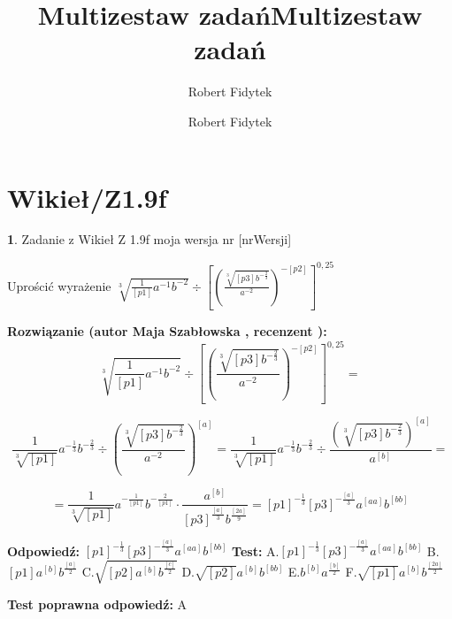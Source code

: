 \documentclass[12pt, a4paper]{article}
\title{Multizestaw zadań}
\author{Robert Fidytek}
\date{}\documentclass[12pt, a4paper]{article}
\title{Multizestaw zadań}
\author{Robert Fidytek}
\date{}
\theoremstyle{definition} %
\newtheorem{zad}{}
\theoremstyle{definition} %
\newtheorem{zad}{}
\newcommand{\kategoria}[1]{\section{#1}} %
\newcommand{\zadStart}[1]{\begin{zad}#1\newline} %
\newcommand{\zadStop}{\end{zad}}   %
\newcommand{\rozwStart}[2]{\noindent \textbf{Rozwiązanie (autor #1 , recenzent #2): }\newline} %
\newcommand{\rozwStop}{\newline}                                            %
\newcommand{\odpStart}{\noindent \textbf{Odpowiedź:}\newline}    %
\newcommand{\odpStop}{\newline}                                             %
\newcommand{\testStart}{\noindent \textbf{Test:}\newline} %
\newcommand{\testStop}{\newline} %
\newcommand{\kluczStart}{\noindent \textbf{Test poprawna odpowiedź:}\newline} %
\newcommand{\kluczStop}{\newline} %
\begin{document}
\maketitle


\kategoria{Wikieł/Z1.9f}
\zadStart{Zadanie z Wikieł Z 1.9f moja wersja nr [nrWersji]}


Uprościć wyrażenie $\sqrt[3]{\frac{1}{[p1]}a^{-1}b^{-2}}\div\left[\left(\frac{\sqrt[3]{[p3]b^{-\frac{2}{3}}}}{a^{-2}}\right)^{-[p2]}\right]^{0,25}$

\zadStop

\rozwStart{Maja Szabłowska}{}
$$\sqrt[3]{\frac{1}{[p1]}a^{-1}b^{-2}}\div\left[\left(\frac{\sqrt[3]{[p3]b^{-\frac{2}{3}}}}{a^{-2}}\right)^{-[p2]}\right]^{0,25}=$$

$$\frac{1}{\sqrt[3]{[p1]}}a^{-\frac{1}{3}}b^{-\frac{2}{3}}\div \left(\frac{\sqrt[3]{[p3]b^{-\frac{2}{3}}}}{a^{-2}}\right)^{[a]}=\frac{1}{\sqrt[3]{[p1]}}a^{-\frac{1}{3}}b^{-\frac{2}{3}}\div \frac{\left(\sqrt[3]{[p3]b^{-\frac{2}{3}}}\right)^{[a]}}{a^{[b]}}=$$

$$=\frac{1}{\sqrt[3]{[p1]}}a^{-\frac{1}{[p1]}}b^{-\frac{2}{[p1]}}\cdot\frac{a^{[b]}}{[p3]^{\frac{[a]}{3}}b^{\frac{[2a]}{9}}}=[p1]^{-\frac{1}{3}}[p3]^{-\frac{[a]}{3}}a^{[aa]}b^{[bb]}$$


\rozwStop


\odpStart
$[p1]^{-\frac{1}{3}}[p3]^{-\frac{[a]}{3}}a^{[aa]}b^{[bb]}$
\odpStop
\testStart
A.$[p1]^{-\frac{1}{3}}[p3]^{-\frac{[a]}{3}}a^{[aa]}b^{[bb]}$
B.$[p1]a^{[b]}b^{\frac{[a]}{2}}$
C.$\sqrt{[p2]a^{[b]}b^{\frac{[c]}{2}}}$
D.$\sqrt{[p2]}a^{[b]}b^{[bb]}$
E.$b^{[b]}a^{\frac{[b]}{2}}$
F.$\sqrt{[p1]}a^{[b]}b^{\frac{[2a]}{2}}$


\testStop
\kluczStart
A
\kluczStop
\end{document}
